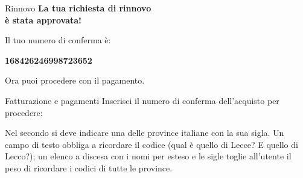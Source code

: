 \begin{center}
\begin{minipage}[t]{0.36\linewidth}\centering
  \begin{finestra}{Rinnovo}
    \centering
    {\color{swred}\textbf{La tua richiesta di rinnovo\\è stata approvata!}}\par\smallskip
    Il tuo numero di conferma è:\par
    \textbf{168426246998723652}\par\smallskip
    Ora puoi procedere con il pagamento.
  \end{finestra}
\end{minipage}\hspace{0.04\linewidth}\raisebox{-1.2cm}{\Large\textcolor{swteal}{$\Rightarrow$}}\hspace{0.04\linewidth}%
\begin{minipage}[t]{0.36\linewidth}\centering
  \begin{finestra}{Fatturazione e pagamenti}
    Inserisci il numero di conferma dell'acquisto per procedere:\par\smallskip
    \campo[3.6cm]{\phantom{0}}
  \end{finestra}\par\smallskip\male
\end{minipage}
\end{center}

Nel secondo si deve indicare una delle province italiane con la sua sigla. Un campo di testo obbliga a ricordare il
codice (qual è quello di Lecce? E quello di Lecco?); un elenco a discesa con i nomi per esteso e le sigle toglie
all'utente il peso di ricordare i codici di tutte le province.

